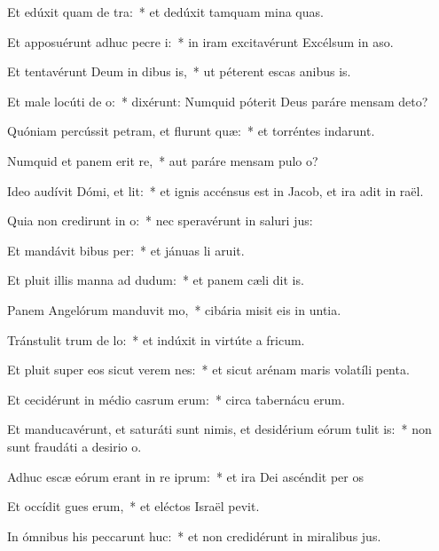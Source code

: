 \item Et edúxit quam de tra:~* et dedúxit tamquam mina quas.
\item Et apposuérunt adhuc pecre i:~* in iram excitavérunt Excélsum in aso.
\item Et tentavérunt Deum in dibus is,~* ut péterent escas anibus is.
\item Et male locúti  de o:~* dixérunt: Numquid póterit Deus paráre mensam  deto?
\item Quóniam percússit petram, et flurunt quæ:~* et torréntes indarunt.
\item Numquid et panem erit re,~* aut paráre mensam pulo o?
\item Ideo audívit Dómi, et lit:~* et ignis accénsus est in Jacob, et ira adit in raël.
\item Quia non credirunt in o:~* nec speravérunt in saluri jus:
\item Et mandávit bibus per:~* et jánuas li aruit.
\item Et pluit illis manna ad dudum:~* et panem cæli dit is.
\item Panem Angelórum manduvit mo,~* cibária misit eis in untia.
\item Tránstulit trum de lo:~* et indúxit in virtúte a fricum.
\item Et pluit super eos sicut verem nes:~* et sicut arénam maris volatíli penta.
\item Et cecidérunt in médio casrum erum:~* circa tabernácu erum.
\item Et manducavérunt, et saturáti sunt nimis, et desidérium eórum tulit is:~* non sunt fraudáti a desirio o.
\item Adhuc escæ eórum erant in re iprum:~* et ira Dei ascéndit per os
\item Et occídit gues erum,~* et eléctos Israël pevit.
\item In ómnibus his peccarunt huc:~* et non credidérunt in miralibus jus.
